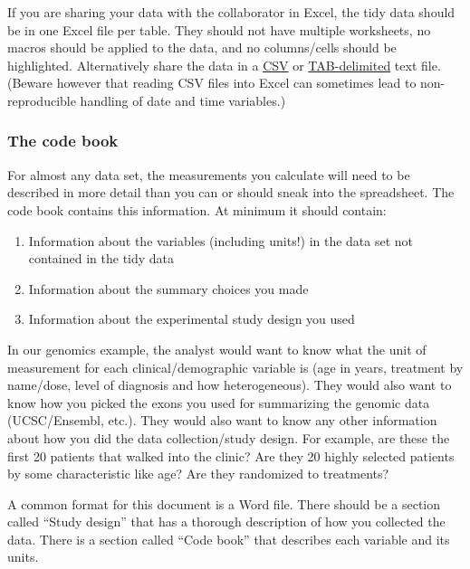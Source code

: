 \documentclass[
]{article}
\providecommand{\tightlist}{%
  \setlength{\itemsep}{0pt}\setlength{\parskip}{0pt}}
\begin{document}
If you are sharing your data with the collaborator in Excel, the tidy
data should be in one Excel file per table. They should not have
multiple worksheets, no macros should be applied to the data, and no
columns/cells should be highlighted. Alternatively share the data in a
\href{http://en.wikipedia.org/wiki/Comma-separated_values}{CSV} or
\href{http://en.wikipedia.org/wiki/Tab-separated_values}{TAB-delimited}
text file. (Beware however that reading CSV files into Excel can
sometimes lead to non-reproducible handling of date and time variables.)

\hypertarget{the-code-book}{%
\subsubsection{The code book}\label{the-code-book}}

For almost any data set, the measurements you calculate will need to be
described in more detail than you can or should sneak into the
spreadsheet. The code book contains this information. At minimum it
should contain:

\begin{enumerate}
\def\labelenumi{\arabic{enumi}.}
\tightlist
\item
  Information about the variables (including units!) in the data set not
  contained in the tidy data
\item
  Information about the summary choices you made
\item
  Information about the experimental study design you used
\end{enumerate}

In our genomics example, the analyst would want to know what the unit of
measurement for each clinical/demographic variable is (age in years,
treatment by name/dose, level of diagnosis and how heterogeneous). They
would also want to know how you picked the exons you used for
summarizing the genomic data (UCSC/Ensembl, etc.). They would also want
to know any other information about how you did the data
collection/study design. For example, are these the first 20 patients
that walked into the clinic? Are they 20 highly selected patients by
some characteristic like age? Are they randomized to treatments?

A common format for this document is a Word file. There should be a
section called ``Study design'' that has a thorough description of how
you collected the data. There is a section called ``Code book'' that
describes each variable and its units.
\end{document}
